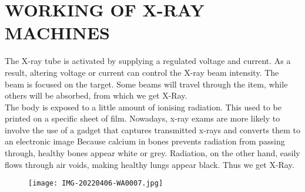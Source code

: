 \documentclass[12pt]{article}
\begin{document}
\section{WORKING OF X-RAY MACHINES }
The X-ray tube is activated by supplying a regulated voltage and current. As a result, altering voltage or current can control the X-ray beam intensity. The beam is focused on the target. Some beams will travel through the item, while others will be absorbed, from which we get X-Ray.
\\
The body is exposed to a little amount of ionising radiation. This used to be printed on a specific sheet of film. Nowadays, x-ray exams are more likely to involve the use of a gadget that captures transmitted x-rays and converts them to an electronic image Because calcium in bones prevents radiation from passing through, healthy bones appear white or grey. Radiation, on the other hand, easily flows through air voids, making healthy lungs appear black. Thus we get X-Ray.
\begin{figure}
\centering
\texttt{[image: IMG-20220406-WA0007.jpg]}
\caption{}
\end{figure}
\\
\end{document}
